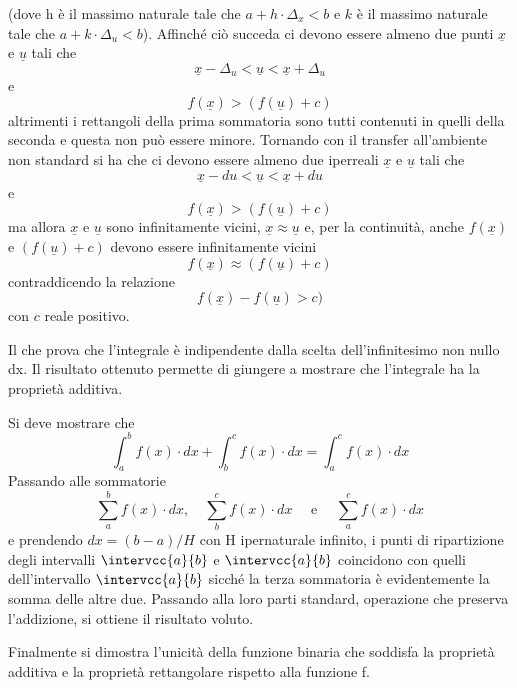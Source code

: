 (dove h è il massimo naturale tale che 
\(a+h \cdot \Delta_x < b\) 
e \(k\) è il massimo naturale tale che
\(a+k \cdot \Delta_u < b\)).
Affinché ciò succeda ci devono essere almeno 
due punti 
\(\underline{x}\) e \(\underline{u}\)
tali che 
\[\underline{x} - \Delta_u < \underline{u} < \underline{x} + \Delta_u \]
e 
\[f(\underline{x}) > (f(\underline{u})+c)\] 
altrimenti i rettangoli della prima sommatoria sono tutti contenuti in quelli 
della seconda e questa non può essere minore. Tornando con il transfer 
all'ambiente non standard si ha che ci devono essere almeno due iperreali 
\(\underline{x}\) e \(\underline{u}\)
tali che 
\[\underline{x} - du < \underline{u} < \underline{x}+ du\]
e 
\[f(\underline{x}) > (f(\underline{u})+c)\] 
ma allora \(\underline{x}\) e \(\underline{u}\)
sono infinitamente vicini,  
\(\underline{x} \approx \underline{u}\)
e, per la continuità, anche 
\(f(\underline{x})\) e \((f(\underline{u})+c)\) 
devono essere infinitamente vicini 
\[f(\underline{x}) \approx (f(\underline{u})+c)\] 
contraddicendo la relazione 
\[f(\underline{x}) - f(\underline{u}) > c)\]
con \(c\) reale positivo. 

Il che prova che l'integrale è indipendente dalla scelta dell'infinitesimo non 
nullo dx.
Il risultato ottenuto permette di giungere a mostrare che 
l'integrale ha la proprietà additiva.

Si deve mostrare che 
\[\int_a^b f(x) \cdot dx + \int_b^c f(x) \cdot dx = \int_a^c f(x) \cdot dx\] 
Passando alle sommatorie 
\[\sum_a^b f(x) \cdot dx,\quad \sum_b^c f(x) \cdot dx \quad\text{ e } \quad 
  \sum_a^c f(x) \cdot dx\] 
e prendendo 
\(dx = (b-a)/H\)
con H ipernaturale infinito, 
i punti di ripartizione degli intervalli \(\intervcc{a}{b}\) e 
\(\intervcc{a}{b}\) coincidono con quelli dell'intervallo \(\intervcc{a}{b}\)
sicché la terza sommatoria è evidentemente la somma delle altre due.
Passando alla loro parti standard, operazione che preserva l'addizione, si 
ottiene il risultato voluto. 

Finalmente si dimostra l'unicità della funzione binaria che soddisfa la 
proprietà additiva e la proprietà rettangolare rispetto alla funzione f.

